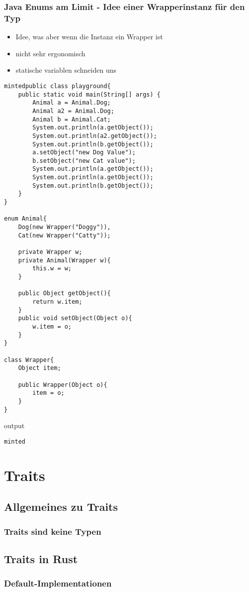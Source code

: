 \documentclass[a4paper, 1ppt]{article}
\begin{document}
\subsubsection{Java Enums am Limit - Idee einer Wrapperinstanz für den Typ}
\begin{itemize}
	\item Idee, was aber wenn die Instanz ein Wrapper ist
	\item nicht sehr ergonomisch 
	\item statische variablen schneiden uns 
\end{itemize}
\begin{verbatim}
mintedpublic class playground{
	public static void main(String[] args) {
		Animal a = Animal.Dog;
		Animal a2 = Animal.Dog;
		Animal b = Animal.Cat;
		System.out.println(a.getObject());
		System.out.println(a2.getObject());
		System.out.println(b.getObject());
		a.setObject("new Dog Value");
		b.setObject("new Cat value");
		System.out.println(a.getObject());
		System.out.println(a.getObject());
		System.out.println(b.getObject());
	}
}

enum Animal{
	Dog(new Wrapper("Doggy")),
	Cat(new Wrapper("Catty"));

	private Wrapper w;
	private Animal(Wrapper w){
		this.w = w;
	}

	public Object getObject(){
		return w.item;
	}
	public void setObject(Object o){
		w.item = o;
	}
}

class Wrapper{
	Object item;

	public Wrapper(Object o){
		item = o;
	}
}
\end{verbatim}
output
\begin{verbatim}
minted
\end{verbatim}
\section{Traits}
\subsection{Allgemeines zu Traits}
\subsubsection{Traits sind keine Typen}
\subsection{Traits in Rust}
\subsubsection{Default-Implementationen}
\end{document}
